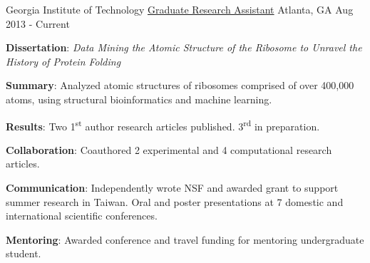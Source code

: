 

\begin{cventries}

  \cventry
    {Georgia Institute of Technology} %
    {\href{https://scholar.google.com/citations?hl=en&user=KIFFrX4AAAAJ&view_op=list_works&gmla=AJsN-F6ZS9ZeLqMG4o6JCZS87HLjoP76wA4kFValw4xx0A6ZWJJoxCWe2xu6VZvt_LgEw9YpCglVTlKY_5PfKpxiyghYFxLPNm5zrUwdBE5Fn-Sr098nt7NJGM2cH5l47IrTsSra8Vob}{Graduate Research Assistant}} %
    {Atlanta, GA} %
    {Aug 2013 - Current} %
    {{\textbf{Dissertation}: \textit{Data Mining the Atomic Structure of the Ribosome to Unravel the History of Protein Folding}}
      \begin{cvitems} %
      \vspace{4.0mm}
        \item \textbf{Summary}: Analyzed atomic structures of ribosomes comprised of over 400,000 atoms, using structural bioinformatics and machine learning. 
        \item \textbf{Results}: Two 1\textsuperscript{st} author research articles published. 3\textsuperscript{rd} in preparation.
        \item \textbf{Collaboration}: Coauthored 2 experimental and 4 computational research articles.
        \item \textbf{Communication}: Independently wrote NSF and awarded grant to support summer research in Taiwan. Oral and poster presentations at 7 domestic and international scientific conferences.
        \item \textbf{Mentoring}: Awarded conference and travel funding for mentoring undergraduate student.
      \end{cvitems}
    }


\end{cventries}
